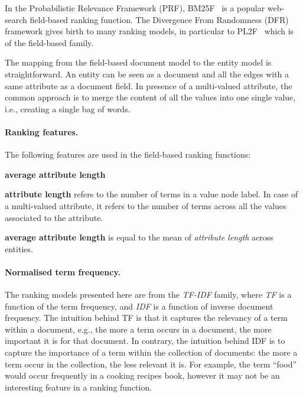 In the Probabilistic Relevance Framework\cite{Robertson:2009:PRF} (PRF), BM25F~\cite{zaragoza:2004:microsoft} is a popular web-search field-based ranking function.
The Divergence From Randomness\cite{amati:2002:acm} (DFR) framework gives birth to many ranking models, in particular to PL2F~\cite{macdonald:2005:clef} which is of the field-based family.

The mapping from the field-based document model to the entity model is straightforward. An entity can be seen as a document and all the edges with a same attribute as a document field. In presence of a multi-valued attribute, the common approach is to merge the content of all the values into one single value, i.e., creating a single bag of words.

\paragraph{Ranking features.}

The following features are used in the field-based ranking functions:
\begin{labeling}{\textbf{average attribute length}}
	\item[\textbf{attribute length}] refers to the number of terms in a value node label. In case of a multi-valued attribute, it refers to the number of terms across all the values associated to the attribute.
	\item[\textbf{average attribute length}] is equal to the mean of \emph{attribute length} across entities.
\end{labeling}

\paragraph{Normalised term frequency.}

The ranking models presented here are from the \emph{TF-IDF} family, where \emph{TF} is a function of the term frequency, and \emph{IDF} is a function of inverse document frequency. The intuition behind TF is that it captures the relevancy of a term within a document, e.g., the more a term occurs in a document, the more important it is for that document. In contrary, the intuition behind IDF is to capture the importance of a term within the collection of documents: the more a term occur in the collection, the less relevant it is. For example, the term ``food'' would occur frequently in a cooking recipes book, however it may not be an interesting feature in a ranking function.

